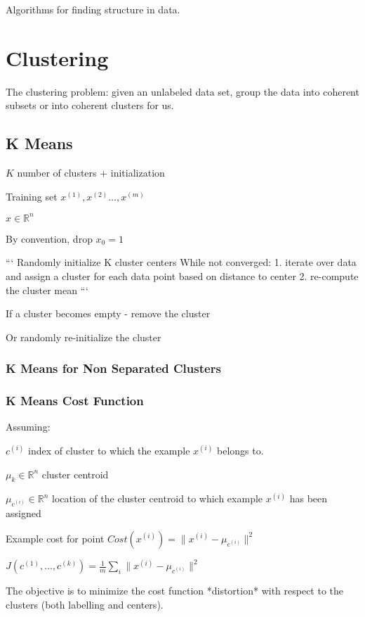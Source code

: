 {{{{{{Algorithms for finding structure in data.

\section{Clustering}

The clustering problem: given an unlabeled data set, group the data into coherent  subsets or into coherent clusters for us.

\subsection{K Means}

\item $K$ number of clusters + initialization
\item Training set ${x^{(1)},x^{(2)}\dots,x^{(m)}}$
\item $x\in\mathbb{R}^n$
\item By convention, drop $x_0=1$

```
Randomly initialize K cluster centers
While not converged:
1. iterate over data and assign a cluster for each data point based on distance to center
2. re-compute the cluster mean
```

If a cluster becomes empty - remove the cluster

Or randomly re-initialize the cluster

\subsubsection{K Means for Non Separated Clusters}

\subsubsection{K Means Cost Function}

Assuming: 

$c^{(i)}$ index of cluster to which the example $x^{(i)}$ belongs to.

$\mu_k \in \mathbb R ^n $ cluster centroid 

$\mu_{c^{(i)}} \in \mathbb R ^n $ location of the cluster centroid to which example $x^{(i)}$ has been assigned

Example cost for point $Cost(x^{(i)}) = \|x^{(i)} - \mu_{c^{(i)}} \|^2$ 

$J(c^{(1)},\dots, c^{(k)})= \frac{1}{m}\sum_i \|x^{(i)} - \mu_{c^{(i)}} \|^2 $

The objective is to minimize the cost function *distortion* with respect to the clusters (both labelling and centers).

}}}}}}
